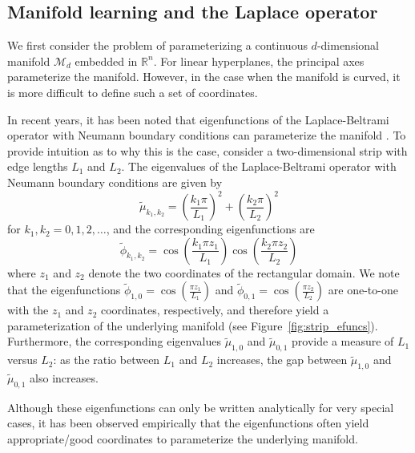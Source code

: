 \documentclass[preprint]{elsarticle}
\begin{document}
\subsection{Manifold learning and the Laplace operator}

We first consider the problem of parameterizing a continuous $d$-dimensional manifold $\mathcal{M}_d$ embedded in $\mathbb{R}^n$.
%
For linear hyperplanes,  the principal axes parameterize the manifold.
%
However, in the case when the manifold is curved, it is more difficult to define such a set of coordinates. 

In recent years, it has been noted that eigenfunctions of the Laplace-Beltrami operator with Neumann boundary conditions can parameterize the manifold \cite{Belkin2003, coifman2005geometric, singer2008non}. 
%
To provide intuition as to why this is the case, consider a two-dimensional strip with edge lengths $L_1$ and $L_2$. 
%
The eigenvalues of the Laplace-Beltrami operator with Neumann boundary conditions are given by
\begin{equation} \label{eq:evals}
\tilde{\mu}_{k_1, k_2} = \left( \frac{k_1 \pi}{L_1} \right)^2 + \left( \frac{k_2 \pi}{L_2} \right)^2
\end{equation}
for $k_1, k_2 = 0, 1, 2, \dots$,
and the corresponding eigenfunctions are 
\begin{equation} \label{eq:efuncs}
\tilde{\phi}_{k_1, k_2} = \cos \left( \frac{k_1 \pi z_1}{L_1} \right) \cos \left( \frac{k_2 \pi z_2}{L_2} \right)
\end{equation}
where $z_1$ and $z_2$ denote the two coordinates of the rectangular domain. 
%
We note that the eigenfunctions $\tilde{\phi}_{1, 0} = \cos \left( \frac{\pi z_1}{L_1} \right)$ and $\tilde{\phi}_{0, 1} = \cos \left( \frac{\pi z_2}{L_2} \right)$ are one-to-one with the $z_1$ and $z_2$ coordinates, respectively, and therefore yield a parameterization of the underlying manifold (see Figure~\ref{fig:strip_efuncs}). 
%
Furthermore, the corresponding eigenvalues $\tilde{\mu}_{1,0}$ and $\tilde{\mu}_{0,1}$ provide a measure of $L_1$ versus $L_2$: as the ratio between $L_1$ and $L_2$ increases, the gap between $\tilde{\mu}_{1,0}$ and $\tilde{\mu}_{0,1}$ also increases.


Although these eigenfunctions can only be written analytically for very special cases, it has been observed empirically that the eigenfunctions often yield appropriate/good coordinates to parameterize the underlying manifold. 
\end{document}
